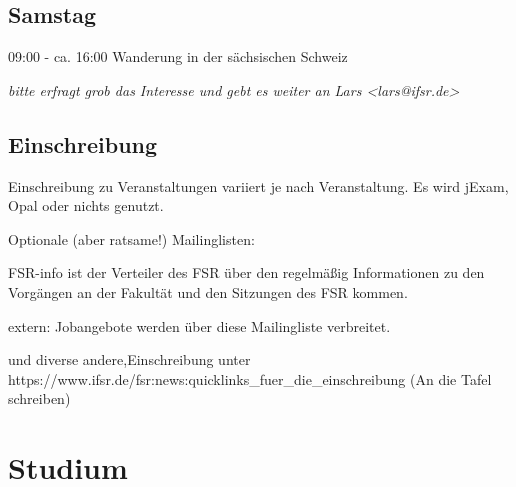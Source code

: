 \documentclass[a4paper,12pt]{report}
\begin{document}
\subsection{Samstag}
\begin{itemize*}
\item 09:00 - ca. 16:00 Wanderung in der sächsischen Schweiz
\begin{itemize*}
  \item \small{\textit{bitte erfragt grob das Interesse und gebt es weiter an Lars <lars@ifsr.de>}}
\end{itemize*}
\end{itemize*}

\subsection{Einschreibung}
\begin{itemize*}
	\item Einschreibung zu Veranstaltungen variiert je nach Veranstaltung. Es wird jExam, Opal oder nichts genutzt.
	
	\item Optionale (aber ratsame!) Mailinglisten:
		\begin{itemize*}
		\item FSR-info ist der Verteiler des FSR über den regelmäßig Informationen zu den Vorgängen an der Fakultät und den Sitzungen des FSR kommen.
		\item extern: Jobangebote werden über diese Mailingliste verbreitet.
		\item und diverse andere,Einschreibung unter \\ https://www.ifsr.de/fsr:news:quicklinks\_fuer\_die\_einschreibung  (An die Tafel schreiben)
	\end{itemize*}
\end{itemize*}

\section{Studium}
\end{document}
